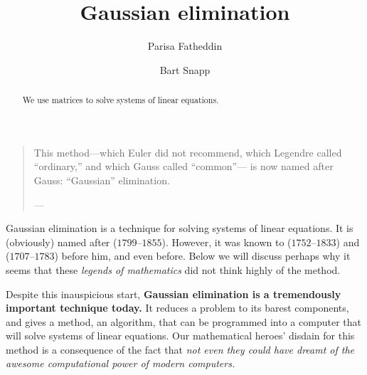 \documentclass{ximera}
\author{Parisa Fatheddin \and Bart Snapp}
\title{Gaussian elimination}
\begin{document}
\begin{abstract}
  We use matrices to solve systems of linear equations.
\end{abstract}
\maketitle

\begin{quote}
  This method---which Euler did not recommend, which Legendre called ``ordinary,'' and which Gauss called ``common''--- is now named after Gauss: ``Gaussian'' elimination.


\hfill ---
\end{quote}

Gaussian elimination is a technique for solving systems of linear
equations. It is (obviously) named after
($1799$--$1855$). However, it was known to
($1752$--$1833$) and
($1707$--$1783$) before him, and even before. Below we will discuss
perhaps why it seems that these \textit{legends of mathematics} did
not think highly of the method.






Despite this inauspicious start, \textbf{Gaussian elimination is a
  tremendously important technique today.} It reduces a problem to
its barest components, and gives a method, an algorithm, that can be
programmed into a computer that will solve systems of linear
equations. Our mathematical heroes' disdain for this method is a
consequence of the fact that \textit{not even they could have dreamt of the awesome
computational power of modern computers.}
\end{document}
